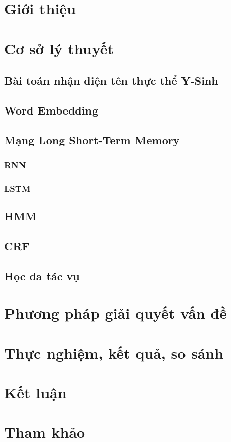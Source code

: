 \documentclass[13pt]{scrbook}
\begin{document}


\frontmatter




\tableofcontents
\mainmatter

\listoftables
\listoffigures

\chapter{Giới thiệu}

\chapter{Cơ sở lý thuyết}
\section{Bài toán nhận diện tên thực thể Y-Sinh}

\section{Word Embedding}

\section{Mạng Long Short-Term Memory}
\subsection{RNN}

\subsection{LSTM}

\section{HMM}

\section{CRF}

\section{Học đa tác vụ}

\chapter{Phương pháp giải quyết vấn đề}


\chapter{Thực nghiệm, kết quả, so sánh}

\chapter{Kết luận}

\chapter{Tham khảo}
\printbibliography[heading=None]
\end{document}

